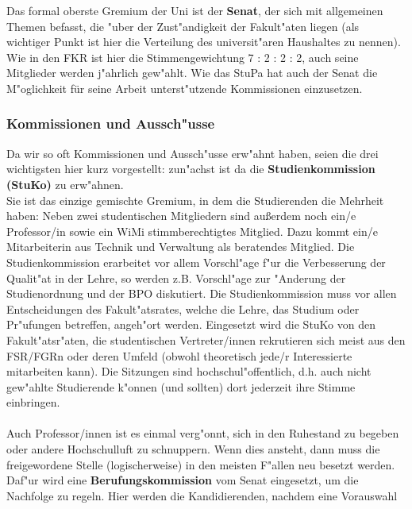 Das formal oberste Gremium der Uni ist der \textbf{Senat}, der sich mit 
allgemeinen Themen befasst, die "uber der Zust"andigkeit der Fakult"aten 
liegen (als wichtiger Punkt ist hier die Verteilung des universit"aren 
Haushaltes zu nennen). Wie in den FKR ist hier die Stimmengewichtung 7 : 2 : 2 
: 2, auch seine Mitglieder werden j"ahrlich gew"ahlt. Wie das StuPa hat auch der 
Senat die M"oglichkeit für seine Arbeit unterst"utzende Kommissionen einzusetzen.

\subsubsection*{Kommissionen und Aussch"usse}

Da wir so oft Kommissionen und Aussch"usse erw"ahnt haben, seien die drei 
wichtigsten hier kurz vorgestellt: zun"achst ist da die 
\textbf{Studienkommission (StuKo)} zu erw"ahnen.\\ 
Sie ist das einzige gemischte Gremium, in dem die Studierenden die Mehrheit 
haben: Neben zwei studentischen Mitgliedern sind außerdem noch ein/e Professor/in sowie ein WiMi stimmberechtigtes Mitglied. 
Dazu kommt ein/e Mitarbeiterin aus Technik und Verwaltung als beratendes Mitglied.
Die Studienkommission erarbeitet vor allem Vorschl"age f"ur die Verbesserung der 
Qualit"at in der Lehre, so werden z.B. Vorschl"age zur "Anderung der 
Studienordnung und der BPO diskutiert. Die Studienkommission muss vor allen 
Entscheidungen des Fakult"atsrates, welche die Lehre, das Studium oder 
Pr"ufungen betreffen, angeh"ort werden. Eingesetzt wird die StuKo von den 
Fakult"atsr"aten, die studentischen Vertreter/innen rekrutieren sich meist aus den 
FSR/FGRn oder deren Umfeld (obwohl theoretisch jede/r Interessierte mitarbeiten 
kann). Die Sitzungen sind hochschul"offentlich, d.h. auch nicht gew"ahlte 
Studierende k"onnen (und sollten) dort jederzeit ihre Stimme einbringen.
\\
\\
Auch Professor/innen ist es einmal verg"onnt, sich in den Ruhestand zu begeben oder 
andere Hochschulluft zu schnuppern. Wenn dies ansteht, dann muss die 
freigewordene Stelle (logischerweise) in den meisten F"allen neu besetzt 
werden. Daf"ur wird eine \textbf{Berufungskommission} vom Senat eingesetzt, um 
die Nachfolge zu regeln. Hier werden die Kandidierenden, nachdem eine Vorauswahl 
